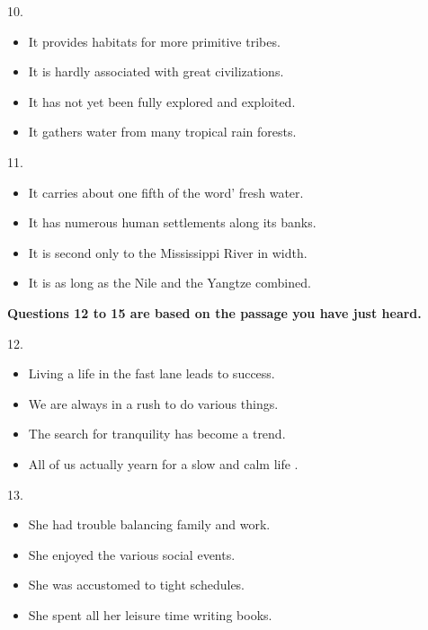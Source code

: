 \documentclass[UTF8,11pt]{ctexart}
\begin{document}
10.


\begin{itemize}[leftmargin=2em,itemsep=.2em,topsep=.4em]\item[A.] It provides habitats for more primitive tribes.
\item[B.] It is hardly associated with great civilizations.
\item[C.] It has not yet been fully explored and exploited.
\item[D.] It gathers water from many tropical rain forests.
\end{itemize}

11.


\begin{itemize}[leftmargin=2em,itemsep=.2em,topsep=.4em]\item[A.] It carries about one fifth of the word' fresh water.
\item[B.] It has numerous human settlements along its banks.
\item[C.] It is second only to the Mississippi River in width.
\item[D.] It is as long as the Nile and the Yangtze combined.
\end{itemize}

\textbf{Questions 12 to 15 are based on the passage you have just heard.}


12.


\begin{itemize}[leftmargin=2em,itemsep=.2em,topsep=.4em]\item[A.] Living a life in the fast lane leads to success.
\item[B.] We are always in a rush to do various things.
\item[C.] The search for tranquility has become a trend.
\item[D.] All of us actually yearn for a slow and calm life .
\end{itemize}

13.


\begin{itemize}[leftmargin=2em,itemsep=.2em,topsep=.4em]\item[A.] She had trouble balancing family and work.
\item[B.] She enjoyed the various social events.
\item[C.] She was accustomed to tight schedules.
\item[D.] She spent all her leisure time writing books.
\end{itemize}
\end{document}
